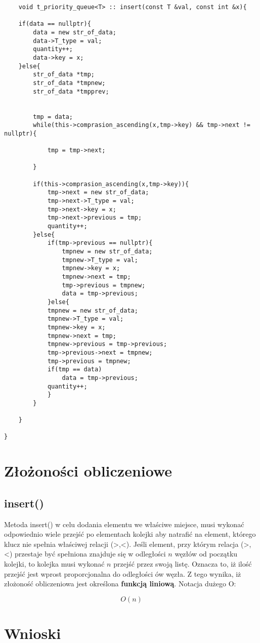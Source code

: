 \documentclass[12pt]{article}
\begin{document}
\begin{lstlisting}
    void t_priority_queue<T> :: insert(const T &val, const int &x){

    if(data == nullptr){
        data = new str_of_data;
        data->T_type = val;
        quantity++;
        data->key = x;
    }else{
        str_of_data *tmp;
        str_of_data *tmpnew;
        str_of_data *tmpprev;
        

        tmp = data;
        while(this->comprasion_ascending(x,tmp->key) && tmp->next != nullptr){

            tmp = tmp->next;

        }

        if(this->comprasion_ascending(x,tmp->key)){
            tmp->next = new str_of_data;
            tmp->next->T_type = val;
            tmp->next->key = x;
            tmp->next->previous = tmp;
            quantity++;
        }else{
            if(tmp->previous == nullptr){
                tmpnew = new str_of_data;
                tmpnew->T_type = val;
                tmpnew->key = x;
                tmpnew->next = tmp;
                tmp->previous = tmpnew;
                data = tmp->previous;
            }else{
            tmpnew = new str_of_data;
            tmpnew->T_type = val;
            tmpnew->key = x;
            tmpnew->next = tmp;
            tmpnew->previous = tmp->previous;
            tmp->previous->next = tmpnew;
            tmp->previous = tmpnew;
            if(tmp == data)
                data = tmp->previous;
            quantity++;
            }
        }        
        
    }

}
\end{lstlisting}


\section{Złożoności obliczeniowe}

\subsection{insert()}

Metoda insert() w celu dodania elementu we właściwe miejsce, musi wykonać odpowiednio wiele przejść po elementach kolejki 
aby natrafić na element, którego klucz nie spełnia właściwej relacji (>,<). Jeśli element, przy którym relacja (>,<)
przestaje być spełniona znajduje się w odległości $n$ węzłów od początku kolejki, to kolejka musi wykonać $n$ przejść 
przez swoją listę. Oznacza to, iż ilość przejść jest wprost proporcjonalna do odległości ów węzła. Z tego wynika, iż
złożoność obliczeniowa jest określona \textbf{funkcją liniową}. Notacja dużego O:

\Large{\begin{equation*}
    O(n)
\end{equation*} }


\section{Wnioski}
\end{document}
